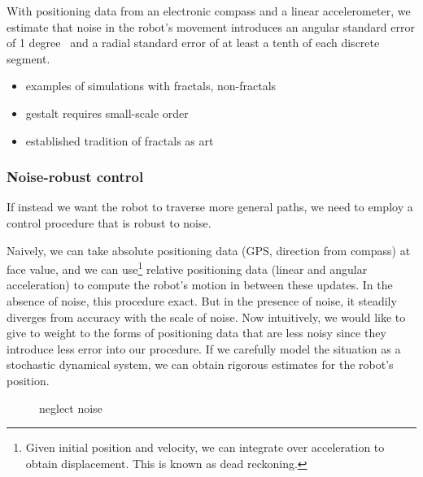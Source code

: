         With positioning data from an electronic compass and a linear accelerometer, we estimate that noise in the robot's movement introduces an angular standard error of 1 degree~\cite{??} and %
        a radial standard error of at least a tenth of each discrete segment.

        \begin{itemize}
            \item examples of simulations with fractals, non-fractals
            \item gestalt requires small-scale order
            \item established tradition of fractals as art
        \end{itemize}


        \subsubsection{Noise-robust control}
        If instead we want the robot to traverse more general paths, we need to employ a control procedure that is robust to noise.

        Naively, we can take absolute positioning data (GPS, direction from compass) at face value, and we can use\footnote{Given initial position and velocity, we can integrate over acceleration to obtain displacement. This is known as dead reckoning.} relative positioning data (linear and angular acceleration) to compute the robot's motion in between these updates.
        In the absence of noise, this procedure exact.
        But in the presence of noise, it steadily diverges from accuracy with the scale of noise.
        Now intuitively, we would like to give to weight to the forms of positioning data that are less noisy since they introduce less error into our procedure.
        If we carefully model the situation as a stochastic dynamical system, we can obtain rigorous estimates for the robot's position.

        \newcommand\ndistr[2]{\mathcal{N}(#1, #2)}
        \newcommand\noise[1]{\epsilon^{(#1)}}
        \newcommand\Real[1]{\mathbb{R}^{#1}}

        \begin{figure}[h]
            \caption{neglect noise}
            \label{fig:SSM}
        \end{figure}

